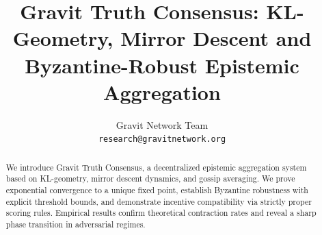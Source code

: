 \documentclass[10pt,conference]{IEEEtran}
\title{Gravit Truth Consensus: KL-Geometry, Mirror Descent and Byzantine-Robust Epistemic Aggregation}
\author{
Gravit Network Team \\
\texttt{research@gravitnetwork.org}
}
\begin{document}
\maketitle

\begin{abstract}
We introduce Gravit Truth Consensus, a decentralized epistemic aggregation system based on KL-geometry, mirror descent dynamics, and gossip averaging. We prove exponential convergence to a unique fixed point, establish Byzantine robustness with explicit threshold bounds, and demonstrate incentive compatibility via strictly proper scoring rules. Empirical results confirm theoretical contraction rates and reveal a sharp phase transition in adversarial regimes.
\end{abstract}











\end{document}
